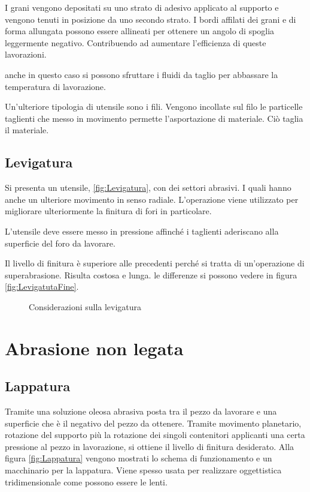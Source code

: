I grani vengono depositati su uno strato di adesivo applicato al supporto e vengono tenuti in posizione da uno secondo strato.
I bordi affilati dei grani e di forma allungata possono essere allineati per ottenere un angolo di spoglia leggermente negativo. Contribuendo ad aumentare l'efficienza di queste lavorazioni.

anche in questo caso si possono sfruttare i fluidi da taglio per abbassare la temperatura di lavorazione.

Un'ulteriore tipologia di utensile sono i fili. Vengono incollate sul filo le particelle taglienti che messo in movimento permette l'asportazione di materiale. Ciò taglia il materiale.

\subsection{Levigatura}
Si presenta un utensile, \ref{fig:Levigatura}, con dei settori abrasivi. I quali hanno anche un ulteriore movimento in senso radiale. L'operazione viene utilizzato per migliorare ulteriormente la finitura di fori in particolare.

L'utensile deve essere messo in pressione affinché i taglienti aderiscano alla superficie del foro da lavorare.

Il livello di finitura è superiore alle precedenti perché si tratta  di un'operazione di superabrasione. Risulta costosa e lunga. le differenze si possono vedere in figura \ref{fig:LevigatutaFine}.

\begin{figure}
\centering
{}\quad
{}
\caption{Considerazioni sulla levigatura}
\label{fig:Levi}
\end{figure}


\section{Abrasione non legata}
\subsection{Lappatura}
Tramite una soluzione oleosa abrasiva posta tra il pezzo da lavorare e una superficie che è il negativo del pezzo da ottenere.
Tramite movimento planetario, rotazione del supporto più la rotazione dei singoli contenitori applicanti una certa pressione al pezzo in lavorazione, si ottiene il livello di finitura desiderato.
Alla figura \ref{fig:Lappatura} vengono mostrati lo schema di funzionamento e un macchinario per la lappatura.
Viene spesso usata per realizzare oggettistica tridimensionale come possono essere le lenti.

